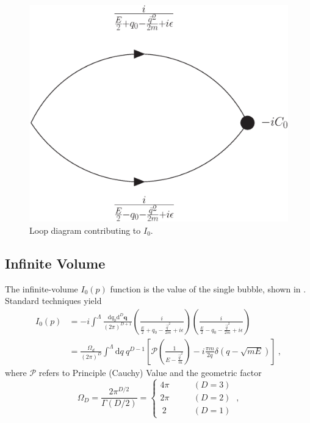 \begin{figure}[h!]
\center
\includegraphics[width=.35\columnwidth]{figure/I0.eps}
\caption{Loop diagram contributing to $I_0$.\label{fig:I0}}
\end{figure}

\subsection{Infinite Volume}

The infinite-volume $I_0(p)$ function is the value of the single bubble, shown in .
Standard techniques yield
\begin{align}
    I_0(p)
    &=-i\int^\Lambda \frac { \mathrm {d}q_0 \mathrm { d } ^ { D } \mathbf { q } } { ( 2 \pi ) ^ { D+1 } } \left( \frac { i } { \frac{E}{2} + q _ { 0 } - \frac{\vec{q}^2}{2m} + i \epsilon } \right) \left( \frac { i } { \frac{E}{2} - q _ { 0 } - \frac{\vec{q}^2}{2m} + i \epsilon } \right)
    \nonumber\\
    &=\frac{\Omega_d}{(2\pi)^D}\int^\Lambda  \mathrm { d } q \ q^{D-1}\left[\mathcal{P} \left( \frac { 1 } { E - \frac{\vec{q}^2}{m} } \right)
-i\frac{\pi m}{2q}\delta(q-\sqrt{mE})\right]
    \label{eq:I0}
    \ ,
\end{align}
where $\mathcal{P}$ refers to Principle (Cauchy) Value and the geometric factor
\begin{equation}
\Omega_D=\frac{2\pi^{D/2}}{\Gamma(D/2)}=
\begin{cases}
4\pi&\quad\quad (D=3)\\
2\pi&\quad\quad (D=2)\\
\ 2\ &\quad\quad (D=1)
\end{cases}\ ,
\end{equation}

